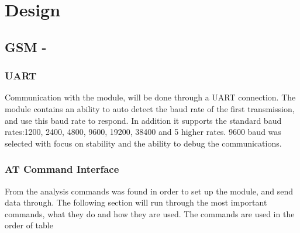 
\chapter{Design}
\label{ch:Design}

\section{GSM - \SARA}

\subsection{UART}
Communication with the \SARA module, will be done through a UART connection. The module contains an ability to auto detect the baud rate of the first transmission, and use this baud rate to respond. In addition it supports the standard baud rates:\num{1200}, \num{2400}, \num{4800}, \num{9600}, \num{19200}, \num{38400} and 5 higher rates. \num{9600} baud was selected with focus on stability and the ability to debug the communications.

\subsection{AT Command Interface}
From the analysis commands was found in order to set up the module, and send data through. The following section will run through the most important commands, what they do and how they are used. The commands are used in the order of table 


